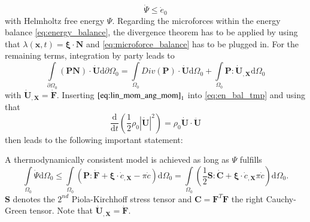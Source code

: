 \begin{equation} \label{eq:entropy_balance}
	\dot{\Psi}\leq\dot{e}_{0}
\end{equation}
with Helmholtz free energy $\Psi$. Regarding the microforces within the energy balance \eqref{eq:energy_balance}, the divergence theorem has to be applied by using that $\lambda\left(\mathbf{x},t\right)=\bm{\xi}\cdot\mathbf{N}$ and \eqref{eq:microforce_balance} has to be plugged in. For the remaining terms, integration by party leads to 
\begin{equation} \label{eq:en_bal_tmp}
	\int\limits_{\partial\Omega_{0}}\left(\mathbf{P}\mathbf{N}\right)\cdot\dot{\mathbf{U}}\mathrm{d}\partial\Omega_{0}=\int\limits_{\Omega_{0}}Div\left(\mathbf{P}\right)\cdot\dot{\mathbf{U}}\mathrm{d}\Omega_{0}+\int\limits_{\Omega_{0}}\mathbf{P}:\dot{\mathbf{U}}_{,\mathbf{X}}\mathrm{d}\Omega_{0}
\end{equation}
with $\dot{\mathbf{U}}_{,\mathbf{X}}=\dot{\mathbf{F}}$. Inserting $\eqref{eq:lin_mom_ang_mom}_{1}$ into \eqref{eq:en_bal_tmp} and using that
\begin{equation}
	\dfrac{\mathrm{d}}{\mathrm{d}t}\left(\dfrac{1}{2}\rho_{0}|\dot{\mathbf{U}}|^{2}\right) = \rho_{0}\dot{\mathbf{U}}\cdot\ddot{\mathbf{U}}
\end{equation}
then leads to the following important statement:

A thermodynamically consistent model is achieved as long as $\Psi$ fulfills
\begin{equation} \label{eq:thermodyn_cons}
		\int\limits_{\Omega_{0}}\dot{\Psi}\mathrm{d}\Omega_{0} \leq \int\limits_{\Omega_{0}}\left(\mathbf{P}:\dot{\mathbf{F}}+\bm{\xi}\cdot\dot{c}_{,\mathbf{X}}-\pi\dot{c}\right)\mathrm{d}\Omega_{0} = \int\limits_{\Omega_{0}}\left(\dfrac{1}{2}\mathbf{S}:\dot{\mathbf{C}}+\bm{\xi}\cdot\dot{c}_{,\mathbf{X}}\pi\dot{c}\right)\mathrm{d}\Omega_{0}.
\end{equation}
$\mathbf{S}$ denotes the $2^{nd}$ Piola-Kirchhoff stress tensor and $\mathbf{C}=\mathbf{F}^{T}\mathbf{F}$ the right Cauchy-Green tensor. Note that $\dot{\mathbf{U}}_{,\mathbf{X}}=\dot{\mathbf{F}}$.

